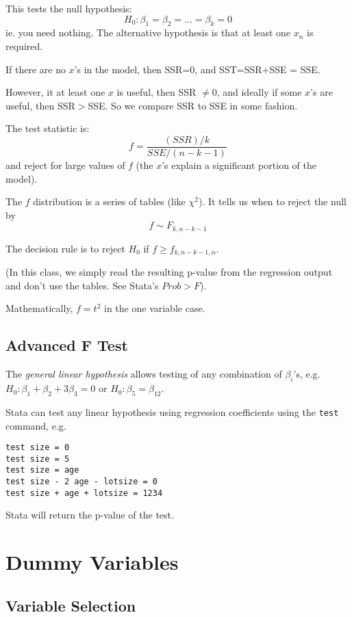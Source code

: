 \documentclass[11pt, oneside]{article}   	%
\begin{document}
This tests the null hypothesis:
\[
H_0 : \beta_1 = \beta_2 = ... = \beta_k = 0
\]
ie. you need nothing. The alternative hypothesis is that at least one $x_n$ is required.

If there are no $x$'s in the model, then SSR=0, and SST=SSR+SSE = SSE.

However, it at least one $x$ is useful, then SSR $\neq 0$, and ideally if some $x$'s are useful, then SSR$>$SSE. So we compare SSR to SSE in some fashion.

The test statistic is:
\[
f = \frac{ (SSR)/k} {SSE/(n-k-1)}
\]
and reject for large values of $f$ (the $x$'s explain a significant portion of the model).

The $f$ distribution is a series of tables (like $\chi^2$). It tells us when to reject the null by
\[
f \sim F_{k,n-k-1}
\]

The decision rule is to reject $H_0$ if $f \geq f_{k, n-k-1, \alpha}$.

(In this class, we simply read the resulting p-value from the regression output and don't use the tables. See Stata's $Prob > F$).

Mathematically, $f = t^2$ in the one variable case.

\subsection{Advanced F Test}

The \textit{general linear hypothesis} allows testing of any combination of $\beta_i$'s, e.g. $H_0 : \beta_1 + \beta_2 + 3\beta_3 = 0$ or $H_0 : \beta_5 = \beta_{12}$.

Stata can test any linear hypothesis using regression coefficients using the \texttt{test} command, e.g.

\begin{verbatim}
test size = 0
test size = 5
test size = age
test size - 2 age - lotsize = 0
test size + age + lotsize = 1234
\end{verbatim}

Stata will return the p-value of the test.

\section{Dummy Variables}

\subsection{Variable Selection}
\end{document}
